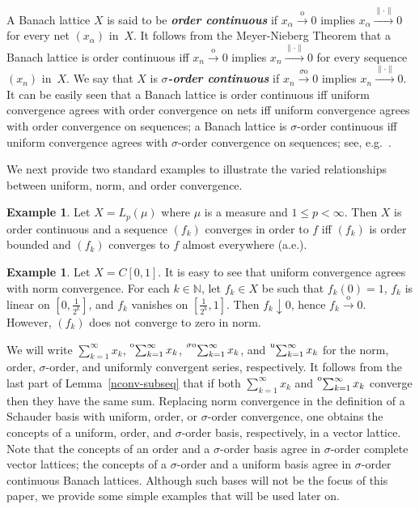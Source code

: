 \documentclass[12pt]{amsart}
\theoremstyle{plain}
\theoremstyle{definition}
\newtheorem{example}[theorem]{Example}
\newcommand{\abs}[1]{\lvert#1\rvert}
\newcommand{\norm}[1]{\lVert#1\rVert}
\newcommand{\term}[1]{{\textit{\textbf{#1}}}}   %
\newcommand{\goeso}{\xrightarrow{\mathrm{o}}}	%
\newcommand{\goesso}{\xrightarrow{\sigma\mathrm{o}}}	%
\newcommand{\goesu}{\xrightarrow{\mathrm{u}}} %
\newcommand{\goesnorm}{\xrightarrow{\norm{\cdot}}} %
\newcommand{\s}{\sum_{k=1}^\infty}
\newcommand{\tos}{\prescript{{\rm o}}{}{\sum_{k=1}^\infty\,}}
\newcommand{\tsos}{\prescript{{\sigma\rm o}}{}{\sum_{k=1}^\infty\,}}
\newcommand{\tus}{\prescript{{\rm u}}{}{\sum_{k=1}^\infty\,}}
\renewcommand{\le}{\leqslant}
\begin{document}

A Banach lattice $X$ is said to be \term{order continuous} if
$x_\alpha\goeso 0$ implies $x_\alpha\goesnorm 0$ for every net
$(x_\alpha)$ in~$X$. It follows from the Meyer-Nieberg Theorem that a
Banach lattice is order continuous iff $x_n\goeso 0$ implies
$x_n\goesnorm 0$ for every sequence $(x_n)$ in~$X$. We say that $X$ is
\term{$\sigma$-order continuous} if $x_n\goesso 0$ implies
$x_n\goesnorm 0$. It can be easily seen that a Banach lattice is order
continuous iff uniform convergence agrees with order convergence on
nets iff uniform convergence agrees with order convergence on
sequences; a Banach lattice is $\sigma$-order continuous iff uniform
convergence agrees with $\sigma$-order convergence on sequences; see,
e.g.~\cite{Bedingfield:80}.
  
We next provide two standard examples to illustrate the varied
relationships between uniform, norm, and order convergence.

\begin{example}
  Let $X=L_p(\mu)$ where $\mu$ is a measure and $1\le p<\infty$. Then
  $X$ is order continuous and a sequence $(f_k)$ converges in order to
  $f$ iff $(f_k)$ is order bounded and $(f_k)$ converges to $f$ almost
  everywhere (a.e.).
\end{example}

\begin{example}\label{non-o-conv}
  Let $X=C[0,1]$. It is easy to see that uniform convergence agrees
  with norm convergence. For each $k\in\mathbb N$, let $f_k\in X$ be
  such that $f_k(0)=1$, $f_k$ is linear on $[0,\frac{1}{2^k}]$, and
  $f_k$ vanishes on $[\frac{1}{2^k},1]$. Then $f_k\downarrow 0$, hence
  $f_k\goeso 0$. However, $(f_k)$ does not converge to zero in norm.
\end{example}

We will write $\s x_k$, $\tos x_k$, $\tsos x_k$, and $\tus x_k$ for
the norm, order, $\sigma$-order, and uniformly convergent series,
respectively. It follows from the last part of
Lemma~\ref{nconv-subseq} that if both $\s x_k$ and $\tos x_k$ converge
then they have the same sum. Replacing norm convergence in the
definition of a Schauder basis with uniform, order, or $\sigma$-order
convergence, one obtains the concepts of a uniform, order, and
$\sigma$-order basis, respectively, in a vector lattice.  Note that
the concepts of an order and a $\sigma$-order basis agree in
$\sigma$-order complete vector lattices; the concepts of a
$\sigma$-order and a uniform basis agree in $\sigma$-order continuous
Banach lattices. Although such bases will not be the focus of this
paper, we provide some simple examples that will be used later on.
\end{document}
